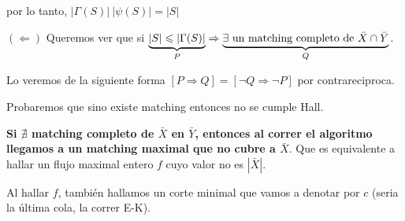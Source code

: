 \documentclass[12pt,a4paper]{article}
\begin{document}
por lo tanto, $|\Gamma(S)| \> |\psi(S)| = |S|$
\medskip

$(\Leftarrow)$ Queremos ver que si $\underbrace{|S| \leqslant |\Gamma(S)|}_{P} \Rightarrow \underbrace{\exists\,\, \text{un matching completo de $\bar{X} \cap \bar{Y}$}}_{Q}$.
\medskip

Lo veremos de la siguiente forma $[P \Rightarrow Q] = [\neg Q \Rightarrow \neg P]$ 
por contrareciproca.
\medskip

Probaremos que sino existe matching entonces no se cumple Hall.
\medskip

\textbf{Si $\nexists$ matching completo de $\bar{X}$ en $\bar{Y}$, entonces al correr el 
algoritmo llegamos a un matching maximal que no cubre a $\bar{X}$}. Que es equivalente a 
hallar un flujo maximal entero $f$ cuyo valor no es $|\bar{X}|$.
\medskip

Al hallar $f$, también hallamos un corte minimal que vamos a denotar por $c$ (seria 
la última cola, la correr E-K).
\medskip
\end{document}
